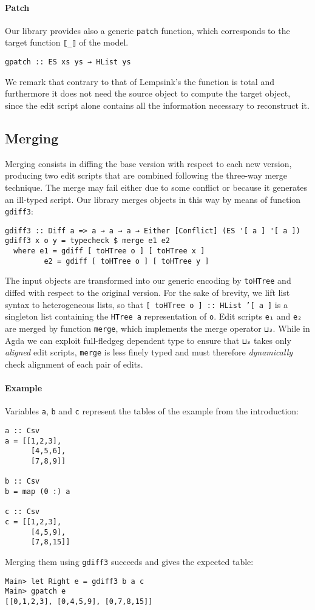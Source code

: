 \documentclass{sigplanconf}
\theoremstyle{plain}
\begin{document}
\paragraph{Patch}
Our library provides also a generic \texttt{patch} function, which corresponds
to the target function \texttt{⟦\_⟧} of the model.
\begin{verbatim}
gpatch :: ES xs ys → HList ys
\end{verbatim}

We remark that contrary to that of Lempsink's \cite{Lemp09} the
function is total and furthermore it does not need the source object to
compute the target object, since the edit script alone contains all
the information necessary to reconstruct it.

\subsection{Merging}
Merging consists in diffing the base version with respect to each new
version, producing two edit scripts that are combined following the
three-way merge technique.
%
The merge may fail either due to some conflict or because it generates
an ill-typed script.
%
Our library merges objects in this way by means of function \texttt{gdiff3}:
\begin{verbatim}
gdiff3 :: Diff a => a → a → a → Either [Conflict] (ES '[ a ] '[ a ])
gdiff3 x o y = typecheck $ merge e1 e2
  where e1 = gdiff [ toHTree o ] [ toHTree x ]
         e2 = gdiff [ toHTree o ] [ toHTree y ]
\end{verbatim}
The input objects are transformed into our generic encoding by
\texttt{toHTree} and diffed with respect to the original version.
%
For the sake of brevity, we lift list syntax to heterogeneous lists,
so that \texttt{[ toHTree o ] :: HList '[ a ]} is a singleton list
containing the \texttt{HTree a} representation of \texttt{o}.
%
Edit scripts \texttt{e₁} and \texttt{e₂} are merged by function
\texttt{merge}, which implements the merge operator \texttt{⊔₃}.
%
While in Agda we can exploit full-fledgeg dependent type to ensure
that \texttt{⊔₃} takes only \emph{aligned} edit scripts,
\texttt{merge} is less finely typed and must therefore
\emph{dynamically} check alignment of each pair of edits.
%

\paragraph{Example}
Variables \texttt{a}, \texttt{b} and \texttt{c} represent the tables
of the example from the introduction:
\begin{verbatim}
a :: Csv
a = [[1,2,3],
      [4,5,6],
      [7,8,9]]

b :: Csv
b = map (0 :) a

c :: Csv
c = [[1,2,3],
      [4,5,9],
      [7,8,15]]
\end{verbatim}
Merging them using \texttt{gdiff3} succeeds and gives the expected table:
\begin{verbatim}
Main> let Right e = gdiff3 b a c
Main> gpatch e
[[0,1,2,3], [0,4,5,9], [0,7,8,15]]
\end{verbatim}
\end{document}
